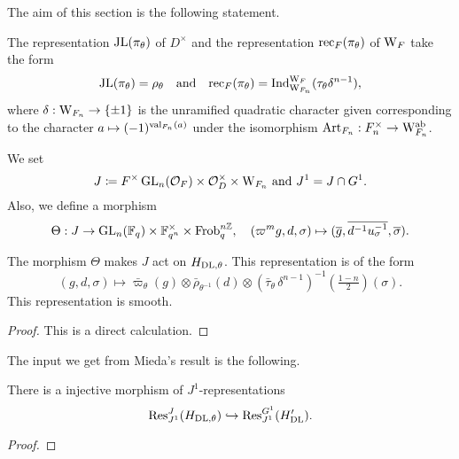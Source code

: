 \documentclass[../main.tex]{subfiles}
\begin{document}
The aim of this section is the following statement.
\begin{thm}\label{thm:MainRes1}
  The representation $\mathrm{JL}(\pi_\theta)$ of $D^\times$ and the representation
  $\mathrm{rec}_F(\pi_\theta)$ of $\mathrm W_F$ take the form
  \begin{equation*}
    \mathrm{JL}(\pi_\theta) = \rho_{\theta}
    \quad \text{and} \quad \mathrm{rec}_F(\pi_\theta) = \mathrm{Ind}_{\mathrm W_{F_n}}^{\mathrm W_F} 
    (\tau_\theta \delta^{n-1}),
  \end{equation*}
  where $\delta: \mathrm W_{F_n} \to \{\pm 1\}$ is the unramified quadratic
  character given corresponding to the character $a \mapsto (-1)^{\mathrm{val}_{F_n}(a)}$
  under the isomorphism $\mathrm{Art}_{F_n}: F_n^\times \to \mathrm W_{F_n}^{\mathrm{ab}}$. 
\end{thm}

We set 
\begin{equation} \label{eq:defJandJ1}
  J \coloneqq F^\times \operatorname{GL}_n(\mathcal{O}_F) \times \mathcal{O}_D^\times \times \mathrm W_{F_n}
  \text{ and } J^1 = J \cap G^1.
\end{equation}
Also, we define a morphism 
\begin{equation*}
  \Theta: J \to \operatorname{GL}_n(\mathbb{F}_q) \times \mathbb{F}_{q^n}^\times \times {\operatorname{Frob}_q^{n\mathbb{Z}}}, \quad
  (\varpi^m g,d,\sigma) \mapsto (\overline g, \overline {d^{-1}u_\sigma^{-1}}, \overline{\sigma}).
\end{equation*}


\begin{lem}
  The morphism $\Theta$ makes $J$ act on ${H}_{\mathrm{DL},\theta}$. This representation is 
  of the form 
  \begin{equation*}
    (g,d,\sigma) \mapsto \bar \varpi_\theta(g) \otimes \bar \rho_{\theta^{-1}}(d)
    \otimes \left(\bar \tau_\theta \, \delta^{n-1}\right)^{-1}(\tfrac{1-n}2)(\sigma).
  \end{equation*}
  This representation is smooth.
\begin{proof}
  This is a direct calculation.
\end{proof}
\end{lem}

The input we get from Mieda's result is the following.
\begin{prop}\label{prop:J1EquivInjMor}
  There is a injective morphism of  $J^1$-representations
  \begin{equation*} 
    \mathrm{Res}_{J^1}^J( H_{\mathrm{DL},\theta} ) \hookrightarrow \mathrm{Res}_{J^1}^{G^1}( H'_{\mathrm{DL}}).
  \end{equation*}
\begin{proof}
\end{proof}
\end{prop}
\end{document}
